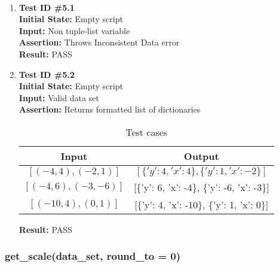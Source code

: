 \documentclass[12pt, titlepage]{article}
\begin{document}
	\paragraph{}
		\begin{enumerate}
			\item{\textbf{Test ID \#5.1\\}}
			\textbf{Initial State:} Empty script\\
			\textbf{Input:} Non tuple-list variable\\
			\textbf{Assertion:} Throws Inconsistent Data error\\
			
			\textbf{Result:} PASS
			
			\item{\textbf{Test ID \#5.2\\}}
			\textbf{Initial State:} Empty script\\
			\textbf{Input:} Valid data set \\
			\textbf{Assertion:} Returns formatted list of dictionaries\\
			\begin{table}[h!]
			  \centering
			  \caption{Test cases}
			  \begin{tabular}{|c|c|}
			  	\toprule
			   	 Input & Output\\
			   	 \midrule
			   	 $[ (-4,4), (-2,1)] $  & $[\{'y':4, 'x':4\}, \{'y':1, 'x':-2\}]$\\
			   	 $[ (-4,6), (-3,-6) ]$ & [\{'y': 6, 'x': -4\}, \{'y': -6, 'x': -3\}]\\
			   	 $[ (-10,4), (0,1) ]$ & [\{'y': 4, 'x': -10\}, \{'y': 1, 'x': 0\}]\\

			   	 \bottomrule
			  \end{tabular}
			\end{table}
			\textbf{Result:} PASS

		\end{enumerate}		

\subsubsection{get\_scale(data\_set, round\_to = 0)}		
	\label{sec:4.0.5}
\end{document}
